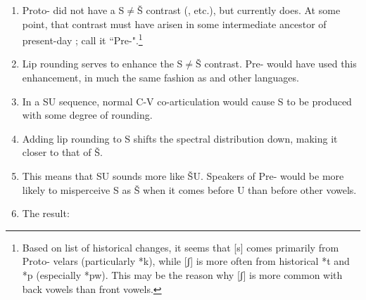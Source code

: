 \begin{enumerate}
\item 
Proto- did not have a S${\neq}$Š contrast (\citealt{Meinhof1932,Hyman:2003a}, etc.), but  currently does. At some point, that contrast must have arisen in some intermediate ancestor of present-day ; call it ``Pre-".\footnote{Based on  list of historical changes, it seems that [s] comes primarily from Proto- velars (particularly *k), while [ʃ] is more often from historical *t and *p (especially *pw). This may be the reason why [ʃ] is more common with back vowels than front vowels.}

\item Lip rounding serves to enhance the S${\neq}$Š contrast. Pre- would have used this enhancement, in much the same fashion as  and other languages.

\item In a SU sequence, normal C-V co-articulation would cause S to be produced with some degree of rounding.

\item Adding lip rounding to S shifts the spectral distribution down, making it closer to that of Š.

\item This means that SU sounds more like ŠU. Speakers of Pre- would be more likely to misperceive S as Š when it comes before U than before other vowels.

\item The result: 


\end{enumerate}
